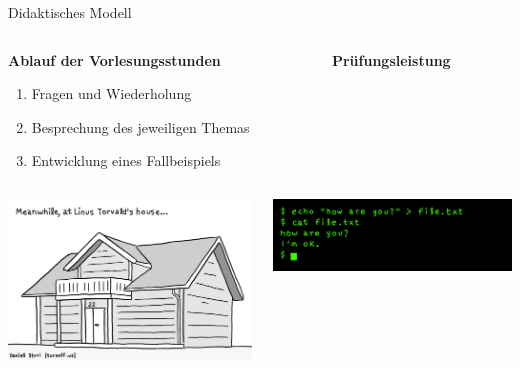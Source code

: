{
\footnotesize

\begin{frame}{Didaktisches Modell}
    \begin{columns}
        \begin{column}[T]{.5\textwidth}
            \textbf{Ablauf der Vorlesungsstunden}
            \medskip

            \begin{enumerate}
                \item Fragen und Wiederholung
                \item Besprechung des jeweiligen Themas
                \item Entwicklung eines Fallbeispiels
            \end{enumerate}
        \end{column}

        \begin{column}[T]{.5\textwidth}
            \textbf{Prüfungsleistung}
            \medskip

        \end{column}
    \end{columns}

    \vfill

    \begin{columns}
        \begin{column}[T]{.5\textwidth}
            \includegraphics[width=\textwidth]{img/linus-torvalds-house}
        \end{column}
        \begin{column}[T]{.5\textwidth}
            \includegraphics[width=\textwidth]{img/ghost-in-the-shell}
        \end{column}
    \end{columns}
\end{frame}
}

